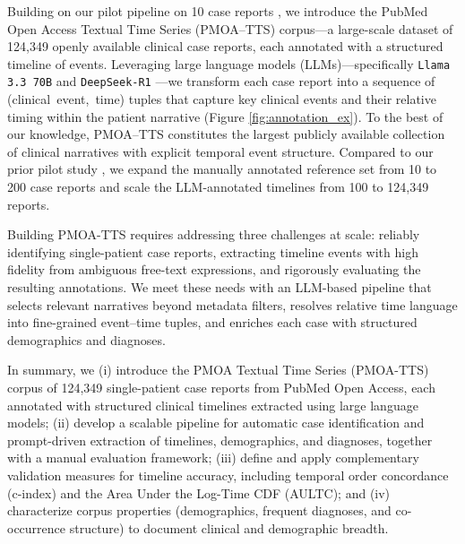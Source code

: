 \documentclass[pdflatex,sn-mathphys-num]{sn-jnl}%
\newif\ifshowrebuttalcolor
\newcommand{\rebuttal}[1]{%
  \ifshowrebuttalcolor
    \textcolor{rebuttalblue}{#1}%
  \else
    #1%
  \fi
}
\theoremstyle{thmstyleone}%
\theoremstyle{thmstyletwo}%
\theoremstyle{thmstylethree}%
\begin{document}
Building on our pilot pipeline on 10 case reports \citep{wang2025large}, we introduce the PubMed Open Access Textual Time Series (PMOA–TTS) corpus—a large-scale dataset of 124{,}349 openly available clinical case reports, each annotated with a structured timeline of events.
Leveraging large language models (LLMs)—specifically \texttt{Llama 3.3 70B} \citep{grattafiori2024llama} and \texttt{DeepSeek-R1} \citep{guo2025deepseek}—we transform each case report into a sequence of \mbox{(clinical event, time)} tuples that capture key clinical events and their relative timing within the patient narrative (Figure \ref{fig:annotation_ex}).
To the best of our knowledge, PMOA–TTS constitutes the largest publicly available collection of clinical narratives with explicit temporal event structure.
Compared to our prior pilot study \cite{wang2025large}, we expand the manually annotated reference set from 10 to 200 case reports and scale the LLM-annotated timelines from 100 to 124{,}349 reports. 

Building PMOA-TTS requires addressing three challenges at scale: reliably identifying single-patient case reports, extracting timeline events with high fidelity from ambiguous free-text expressions, and rigorously evaluating the resulting annotations. We meet these needs with an LLM-based pipeline that selects relevant narratives beyond metadata filters, resolves relative time language into fine-grained event--time tuples, and enriches each case with structured demographics and diagnoses. 



\rebuttal{
In summary, we (i) introduce the PMOA Textual Time Series (PMOA-TTS) corpus of 124{,}349 single-patient case reports from PubMed Open Access, each annotated with structured clinical timelines extracted using large language models; (ii) develop a scalable pipeline for automatic case identification and prompt-driven extraction of timelines, demographics, and diagnoses, together with a manual evaluation framework; (iii) define and apply complementary validation measures for timeline accuracy, including temporal order concordance (c-index) and the Area Under the Log-Time CDF (AULTC); and (iv) characterize corpus properties (demographics, frequent diagnoses, and co-occurrence structure) to document clinical and demographic breadth.
}
\end{document}
